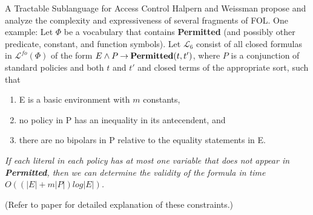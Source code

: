 \documentclass[style=sailor,size=12pt,mode=present]{powerdot}
\newcommand{\bid}[1]{\mbox{\bf #1}}
\theoremstyle{definition}
\newenvironment{thm}[1]
  {\renewcommand\theinnerthm{#1}\innerthm}
  {\endinnerthm}
\begin{document}
\begin{wideslide}[bm=,toc=]{A Tractable Sublanguage for Access
  Control}
Halpern and Weissman propose and analyze the complexity and expressiveness
of several fragments of FOL. One example:
\begin{thm}{4.2}[Halpern and Weissman]
Let $\Phi$ be a vocabulary that contains {\bf Permitted} (and possibly
other predicate, constant, and function symbols). Let $\mathcal{L}_6$
consist of all closed formulas in $\mathcal{L}^{fo}(\Phi)$ of the
form $E \land P \imp \bid{Permitted}(t,t')$, where $P$ is a conjunction
of standard policies and both $t$ and $t'$ and closed terms of the
appropriate sort, such that
\end{thm}
\vspace{-2ex}
\begin{enumerate}
\renewcommand{\labelenumi}{\alph{enumi})}
\item E is a basic environment with $m$ constants,
\item no policy in P has an inequality in its antecendent, and
\item there are no bipolars in P relative to the equality statements
in E.
\end{enumerate}
\emph{If each literal in each policy has at most one variable
  that does not appear in {\bf Permitted}, then we can determine
    the validity of the formula in time $O((|E| + m|P|)log|E|)$.}

    {\tiny (Refer to paper for detailed explanation of these constraints.)}
\end{wideslide}
\end{document}
